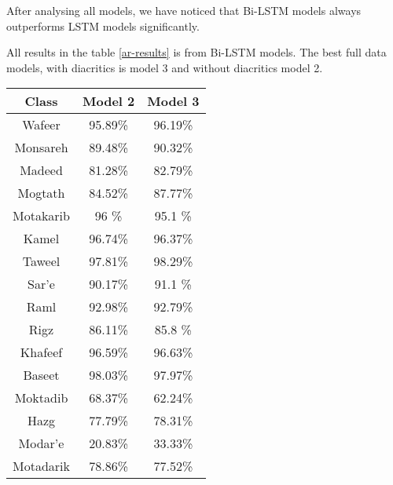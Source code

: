 \begin{center}
\begin{tabular}{c c c c c c c}
     \bottomrule
 \end{tabular}
\label{ar-results}
\end{center}


After analysing all models, we have noticed  that Bi-LSTM models always outperforms
LSTM models significantly.

\begin{center}

\end{center}

All results in the table \ref{ar-results} is from Bi-LSTM models. The best full
data models, with diacritics is model 3 and without diacritics model 2.

\begin{center}
\begin{tabular}{|c|c|c|} 
\hline
\textbf{Class} & \textbf{Model 2} & \textbf{Model 3} \\ 
\hline
   Wafeer     & 95.89\% & 96.19\% \\
   Monsareh   & 89.48\% & 90.32\% \\
   Madeed     & 81.28\% & 82.79\% \\
   Mogtath    & 84.52\% & 87.77\% \\
   Motakarib  & 96   \% & 95.1 \% \\
   Kamel      & 96.74\% & 96.37\% \\
   Taweel     & 97.81\% & 98.29\% \\
   Sar'e      & 90.17\% & 91.1 \% \\
   Raml       & 92.98\% & 92.79\% \\
   Rigz       & 86.11\% & 85.8 \% \\
   Khafeef    & 96.59\% & 96.63\% \\
   Baseet     & 98.03\% & 97.97\% \\
   Moktadib   & 68.37\% & 62.24\% \\
   Hazg       & 77.79\% & 78.31\% \\
   Modar'e    & 20.83\% & 33.33\% \\
   Motadarik  & 78.86\% & 77.52\% \\
\hline
\end{tabular}
\end{center}




















